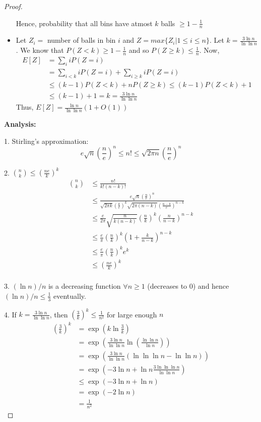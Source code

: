 \documentclass[12pt]{article}
\begin{document}
\begin{proof}
\begin{itemize}
    Hence, probability that all bins have atmost $k$ balls $\geq 1 - \frac{1}{n}$
    
    \item Let $Z_i = $ number of balls in bin $i$ and $Z = max \{Z_i | 1\leq i \leq n \}$. Let $k = \frac{3\ln n}{\ln \ln n}$. We know that $P(Z<k) \geq 1-\frac{1}{n}$ and so $P(Z \geq k) \leq \frac{1}{n}$. Now,
        \begin{align*}
            E[Z] &= \sum_{i} i P(Z=i) \\
            &= \sum_{i<k} i P(Z=i) + \sum_{i \geq k} i P(Z=i) \\
            &\leq (k-1)P(Z < k) + nP(Z \geq k) \leq (k-1)P(Z < k) + 1 \\
            &\leq (k-1)+1 = k =  \frac{3\ln n}{\ln \ln n}
        \end{align*}
    Thus, $E[Z] = \frac{\ln n}{\ln \ln n}(1+O(1))$
\end{itemize}



\textbf{Analysis:}

1. Stirling's approximation: 
$$e \sqrt{n}\left(\frac{n}{e}\right)^n \leq n! \leq \sqrt{2 \pi n}\left(\frac{n}{e}\right)^n$$

2. ${n \choose k} \leq (\frac{ne}{k})^k$
\begin{align*}
    {n \choose k} &\leq \frac{n!}{k!(n-k)!} \\
    &\leq \frac{e\sqrt{n}\left(\frac{n}{e}\right)^n}{\sqrt{2\pi k}\left(\frac{k}{e}\right)^k \sqrt{2 \pi (n-k)}\left(\frac{n-k}{e}\right)^{n-k}} \\ 
    &\leq \frac{e}{2\pi}\sqrt{\frac{n}{k(n-k)}} \left(\frac{n}{k}\right)^k \left(\frac{n}{n-k}\right)^{n-k} \\
    &\leq \frac{e}{\pi} \left(\frac{n}{k}\right)^k \left(1 + \frac{k}{n-k}\right)^{n-k} \\
    &\leq \frac{e}{\pi} \left(\frac{n}{k}\right)^k e^k \\
    &\leq \left(\frac{ne}{k}\right)^k \\
\end{align*}

3. $(\ln n)/n$ is a decreasing function $\forall n \geq 1$ (decreases to $0$) and hence $(\ln n)/n \leq \frac{1}{3}$ eventually.

4. If $k = \frac{3\ln n}{\ln \ln n}$, then $\left(\frac{3}{k}\right)^k \leq \frac{1}{n^2}$ for large enough $n$
\begin{align*}
    \left(\frac{3}{k}\right)^k &= \exp \left( k \ln \frac{3}{k} \right) \\
    &= \exp \left( \frac{3\ln n}{\ln \ln n} \ln \left(\frac{\ln \ln n}{\ln n}\right) \right) \\
    &= \exp \left( \frac{3\ln n}{\ln \ln n} (\ln\ln\ln n - \ln \ln n) \right) \\
    &= \exp \left( -3\ln n + \ln n \frac{3\ln\ln\ln n}{\ln\ln n} \right) \\
    &\leq \exp \left( -3\ln n +  \ln n \right) \\
    &= \exp \left( -2\ln n\right) \\
    &= \frac{1}{n^2}
\end{align*}
\end{proof}

\vspace{2in} %
\end{document}
